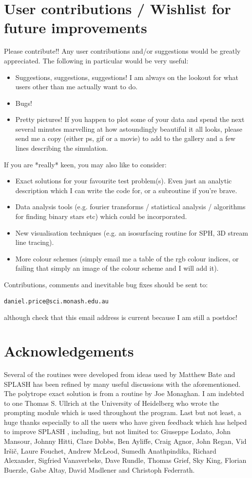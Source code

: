 \documentclass[a4paper,10pt]{article}
\newcommand{\splash}{\textsc{SPLASH }}
\begin{document}
\section{User contributions / Wishlist for future improvements}
 Please contribute!! Any user contributions and/or suggestions would be greatly
appreciated. The following in particular would be very useful:
\begin{itemize}
\item Suggestions, suggestions, suggestions! I am always on the lookout for what users other than me actually want to do.
\item Bugs!
\item Pretty pictures! If you happen to plot some of your data and spend the
next several minutes marvelling at how astoundingly beautiful it all looks, please send
me a copy (either ps, gif or a movie) to add to the gallery and a few lines
describing the simulation.
\end{itemize}
If you are *really* keen, you may also like to consider:
\begin{itemize}
\item Exact solutions for your favourite test problem(s). Even just an analytic description which I can write the code for, or a subroutine if you're brave.
\item Data analysis tools (e.g. fourier transforms / statistical analysis /
algorithms for finding binary stars etc) which could be incorporated.
\item New visualisation techniques (e.g. an isosurfacing routine for SPH, 3D stream line tracing).
\item More colour schemes (simply email me a table of the rgb colour indices, or failing that simply an image of the colour scheme and I will add it).
\end{itemize}
Contributions, comments and inevitable bug fixes
should be sent to:
\begin{verbatim}
daniel.price@sci.monash.edu.au
\end{verbatim}
although check that this email address is current because I am still a postdoc!

\section*{Acknowledgements}
 Several of the routines were developed from ideas used by Matthew Bate and \splash has been refined by many useful discussions with the aforementioned. The
polytrope exact solution is from a routine by Joe Monaghan. I am indebted to one Thomas S. Ullrich at the University of Heidelberg who wrote the prompting module
which is used throughout the program. Last but not least, a huge thanks especially to all the users who have given feedback which has helped to improve \splash, including, but not limited to: Giuseppe Lodato, John Mansour, Johnny Hitti, Clare Dobbs, Ben Ayliffe, Craig Agnor, John Regan, Vid Ir\v{s}i\v{c}, Laure Fouchet, Andrew McLeod, Sumedh Anathpindika, Richard Alexander, Sigfried Vanaverbeke, Dave Rundle, Thomas Grief, Sky King, Florian Buerzle, Gabe Altay, David Madlener and Christoph Federrath.
\end{document}
